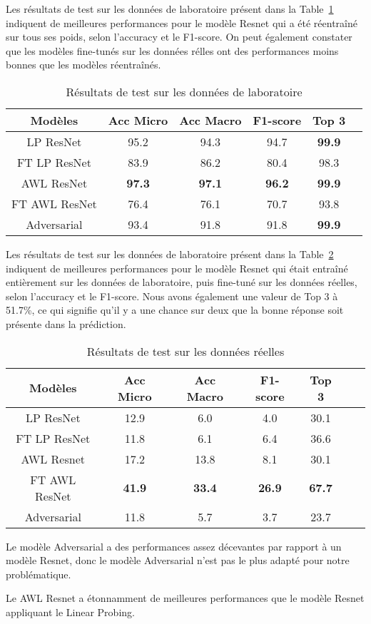 Les résultats de test sur les données de laboratoire présent dans la Table~\ref{tab:results_lab} indiquent de meilleures performances pour le modèle Resnet qui a été réentraîné sur tous ses poids, selon l'accuracy et le F1-score. On peut également constater que les modèles fine-tunés sur les données rélles ont des performances moins bonnes que les modèles réentraînés.

\begin{table}[ht]
  \centering
    \begin{tabular}{cccccc}
    \toprule
    Modèles & Acc Micro & Acc Macro & F1-score & Top 3 \\
    \midrule
    LP ResNet & 95.2 & 94.3 & 94.7 & \textbf{99.9} \\
    FT LP ResNet & 83.9 & 86.2 & 80.4 & 98.3 \\
    AWL ResNet & \textbf{97.3} & \textbf{97.1} & \textbf{96.2} & \textbf{99.9} \\
    FT AWL ResNet & 76.4 & 76.1 & 70.7 & 93.8 \\
    Adversarial & 93.4 & 91.8 & 91.8 & \textbf{99.9} \\
    \bottomrule
    \end{tabular}
    \caption{Résultats de test sur les données de laboratoire}
    \label{tab:results_lab}
\end{table}

Les résultats de test sur les données de laboratoire présent dans la Table~\ref{tab: results_real} indiquent de meilleures performances pour le modèle Resnet qui était entraîné entièrement sur les données de laboratoire, puis fine-tuné sur les données réelles, selon l'accuracy et le F1-score. 
Nous avons également une valeur de Top 3 à 51.7\%, ce qui signifie qu'il y a une chance sur deux que la bonne réponse soit présente dans la prédiction. 

\begin{table}[ht]
  \centering
    \begin{tabular}{ccccccc}
    \toprule
    Modèles & Acc Micro & Acc Macro & F1-score & Top 3 \\
    \midrule
    LP ResNet & 12.9 & 6.0 & 4.0 & 30.1 \\
    FT LP ResNet & 11.8 & 6.1 & 6.4 & 36.6 \\
    AWL Resnet & 17.2 & 13.8 & 8.1 & 30.1 \\
    FT AWL ResNet & \textbf{41.9} & \textbf{33.4} & \textbf{26.9} & \textbf{67.7} \\
    Adversarial & 11.8 & 5.7 & 3.7 & 23.7 \\
    \bottomrule
    \end{tabular}
    \caption{Résultats de test sur les données réelles}
    \label{tab: results_real}
\end{table}

Le modèle Adversarial a des performances assez décevantes par rapport à un modèle Resnet, donc le modèle Adversarial n'est pas le plus adapté pour notre problématique.

Le AWL Resnet a étonnamment de meilleures performances que le modèle Resnet appliquant le Linear Probing. 
